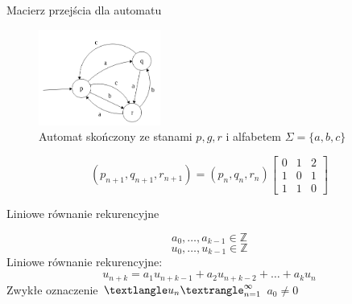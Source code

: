 \documentclass[handout]{beamer}
\theoremstyle{definition}
\theoremstyle{named}
\begin{document}
\begin{frame}{Macierz przejścia dla automatu}
\begin{figure}
    \centering
    \includegraphics[width=40mm]{img/automat.png}
    \caption{Automat skończony ze stanami $p, g, r$ i alfabetem $\Sigma = \{a,b,c \}$}
    \label{fig:my_label}
\end{figure}
\pause
    $$
    (p_{n+1}, q_{n+1}, r_{n+1}) 
    = (p_{n},q_{n},r_{n}) \begin{bmatrix}
    0 & 1 & 2 \\
    1 & 0 & 1 \\
    1 & 1 & 0
    \end{bmatrix}
    $$
\end{frame}

\begin{frame}{Liniowe równanie rekurencyjne}

    \begin{equation}
        
        a_0, \ldots, a_{k-1} \in \mathbb{Z} 
    \end{equation}
    \pause 
    \begin{equation}
        u_0, \ldots, u_{k-1} \in \mathbb{Z}
    \end{equation}
    \pause
    Liniowe równanie rekurencyjne: 
    \begin{equation}
            u_{n+k}=a_{1} u_{n+k-1}+a_{2} u_{n+k-2}+\ldots+a_{k} u_{n}
    \end{equation}
    \pause
    Zwykłe oznaczenie $\textlangle u_n \textrangle _{n=1}^{\infty}$
    $a_0 \neq 0$
\end{frame}
\end{document}
